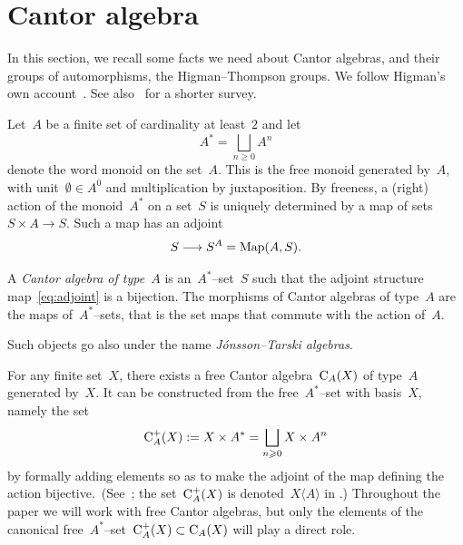 
\section{Cantor algebra}\label{sec:Cantor}

In this section, we recall some facts we need about Cantor algebras, and their groups of automorphisms,  the Higman--Thompson groups. We follow Higman's own account~\cite{Higman}. See also~\cite[Sec.~4]{Bro87} for a shorter survey.


Let~$A$ be a finite set  of cardinality at least~$2$ and 
let
\[
A^*=\bigsqcup_{n\geqslant 0}A^n
\]
denote the word monoid on the set~$A$. This is the free monoid generated by~$A$, with unit~$\emptyset\in A^0$ and multiplication by juxtaposition. 
By freeness, a (right) action of the monoid~$A^*$ on a set~$S$ is uniquely determined by a map of sets~$S\times A\to S$. Such a map has an adjoint
\begin{equation}\label{eq:adjoint}
S\longrightarrow S^A=\operatorname{Map}(A,S).
\end{equation}

\begin{definition}\label{def:Cantor}
A {\em Cantor algebra of type~$A$} is an~$A^*$--set~$S$ such that the
adjoint structure map~\eqref{eq:adjoint} is a bijection. The morphisms of Cantor algebras of type~$A$ are the maps of~$A^*$--sets, that is the set maps that commute with the action of~$A$.  
\end{definition}
Such objects go also under the name {\em J\'onsson--Tarski algebras}.

For any finite set~$X$, there exists a free Cantor algebra~$\mathrm{C}_A(X)$ of type~$A$ generated by~$X$. It can be constructed from the free~$A^*$--set 
with basis~$X$, namely the set
\[
\mathrm{C}_A^+(X):=X\times A^*=\bigsqcup_{n\geqslant 0} X\times A^n
\]
by formally adding elements so as to make the adjoint of the map defining the action bijective.~(See~\cite[Sec.~2]{Higman}; the set~$\mathrm{C}_A^+(X)$ is denoted~$X\langle A\rangle$ in \cite{Higman}.) Throughout the paper we will work with free Cantor algebras, but only the elements of the canonical free~$A^*$--set~$\mathrm{C}^+_A(X)\subset \mathrm{C}_A(X)$ will play a direct role.  



